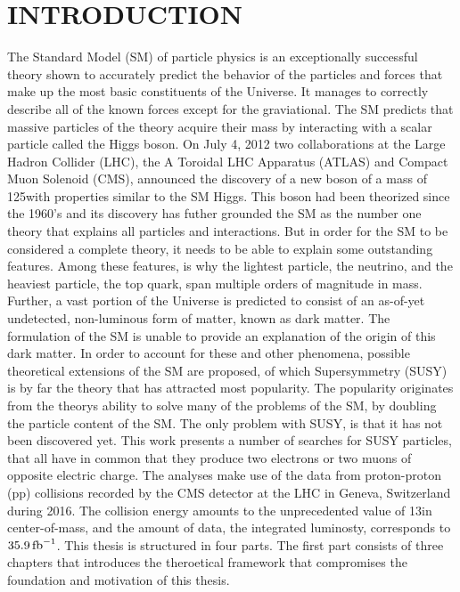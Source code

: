 \chapter{INTRODUCTION} \label{intro}
\noindent\justify
The Standard Model (SM) of particle physics is an exceptionally successful theory shown to accurately predict the behavior of the particles and forces that make up the most basic constituents of the Universe. 
It manages to correctly describe all of the known forces except for the graviational. 
The SM predicts that massive particles of the theory acquire their mass by interacting with a scalar particle called the Higgs boson. 
On July 4, 2012 two collaborations at the Large Hadron Collider (LHC), the A Toroidal LHC Apparatus (ATLAS) and Compact Muon Solenoid (CMS), announced the discovery of a new boson of a mass of 125\GeV with properties similar to the SM Higgs. 
This boson had been theorized since the 1960's and its discovery has futher grounded the SM as the number one theory that explains all particles and interactions. 
\newpara
\noindent\justify
But in order for the SM to be considered a complete theory, it needs to be able to explain some outstanding features. 
Among these features, is why the lightest particle, the neutrino, and the heaviest particle, the top quark, span multiple orders of magnitude in mass. 
Further, a vast portion of the Universe is predicted to consist of an as-of-yet undetected, non-luminous form of matter, known as dark matter. 
The formulation of the SM is unable to provide an explanation of the origin of this dark matter.  
In order to account for these and other phenomena, possible theoretical extensions of the SM are proposed, of which Supersymmetry (SUSY) is by far the theory that has attracted most popularity. 
The popularity originates from the theorys ability to solve many of the problems of the SM, by doubling the particle content of the SM. 
The only problem with SUSY, is that it has not been discovered yet. 
\newpara
\noindent\justify
This work presents a number of searches for SUSY particles, that all have in common that they produce two electrons or two muons of opposite electric charge. 
The analyses make use of the data from proton-proton (pp) collisions recorded by the CMS detector at the LHC in Geneva, Switzerland during 2016. 
The collision energy amounts to the unprecedented value of 13\TeV in center-of-mass, and the amount of data, the integrated luminosty, corresponds to $35.9\mbox{\ensuremath{\,\text{fb}^\text{$-$1}}}$.   
\newpara
\noindent\justify
This thesis is structured in four parts. 
The first part consists of three chapters that introduces the theroetical framework that compromises the foundation and motivation of this thesis. 
